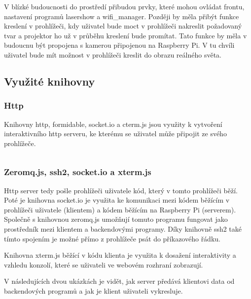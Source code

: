 
V blízké budoucnosti do prostředí přibudou prvky, které mohou ovládat frontu, nastavení programů lasershow a wifi\_manager. Později by měla přibýt funkce kreslení v prohlížeči, kdy uživatel bude moct v prohlížeči nakreslit požadovaný tvar a projektor ho už v průběhu kreslení bude promítat. Tato funkce by měla v budoucnu být propojena s kamerou připojenou na Raspberry Pi. V tu chvíli uživatel bude mít možnost v prohlížeči kreslit do obrazu reálného světa.

\subsection{Využité knihovny}
\subsubsection{Http}
Knihovny http, formidable, socket.io a cterm.js jsou využity k vytvoření interaktivního http serveru, ke kterému se uživatel může připojit ze svého prohlížeče. 

\inputminted[frame=lines,fontsize=\footnotesize{}, linenos, breaklines]{js}{code_examples/http_static_files.js}

\subsubsection{Zeromq.js, ssh2, socket.io a xterm.js}
Http server tedy pošle prohlížeči uživatele kód, který v tomto prohlížeči běží. Poté je knihovna socket.io je využita ke komunikaci mezi kódem běžícím v prohlížeči uživatele (klientem) a kódem běžícím na Raspberry Pi (serverem).
Společně s knihovnou zeromq.js umožňují tomuto programu fungovat jako prostředník mezi klientem a backendovými programy. Díky knihovně ssh2 také tímto spojením je možné přímo z prohlížeče psát do příkazového řádku.

Knihovna xterm.js běžící v kódu klienta je využita k dosažení interaktivity a vzhledu konzolí, které se uživateli ve webovém rozhraní zobrazují.

V následujících dvou ukázkách je vidět, jak server předává klientovi data od backendových programů a jak je klient uživateli vykresluje.

\inputminted[frame=lines,fontsize=\footnotesize{}, linenos, breaklines]{js}{code_examples/socketio_server.js}
\inputminted[frame=lines,fontsize=\footnotesize{}, linenos, breaklines]{js}{code_examples/socketio_client.js}

